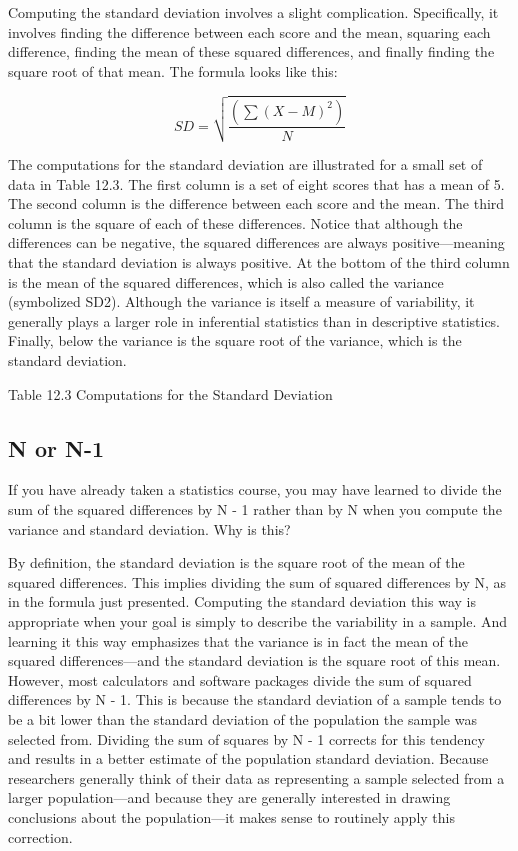 Computing the standard deviation involves a slight complication. Specifically, it involves finding the difference between each score and the mean, squaring each difference, finding the mean of these squared differences, and finally finding the square root of that mean. The formula looks like this:


\begin{equation}
SD=\sqrt{\frac{(\sum(X-M)^2)}{N}}
\end{equation}

The computations for the standard deviation are illustrated for a small set of data in Table 12.3. The first column is a set of eight scores that has a mean of 5. The second column is the difference between each score and the mean. The third column is the square of each of these differences. Notice that although the differences can be negative, the squared differences are always positive---meaning that the standard deviation is always positive. At the bottom of the third column is the mean of the squared differences, which is also called the variance (symbolized SD2). Although the variance is itself a measure of variability, it generally plays a larger role in inferential statistics than in descriptive statistics. Finally, below the variance is the square root of the variance, which is the standard deviation.

Table 12.3 Computations for the Standard Deviation

\subsection{N or N-1}

If you have already taken a statistics course, you may have learned to divide the sum of the squared differences by N - 1 rather than by N when you compute the variance and standard deviation. Why is this?

By definition, the standard deviation is the square root of the mean of the squared differences. This implies dividing the sum of squared differences by N, as in the formula just presented. Computing the standard deviation this way is appropriate when your goal is simply to describe the variability in a sample. And learning it this way emphasizes that the variance is in fact the mean of the squared differences---and the standard deviation is the square root of this mean.
However, most calculators and software packages divide the sum of squared differences by N - 1. This is because the standard deviation of a sample tends to be a bit lower than the standard deviation of the population the sample was selected from. Dividing the sum of squares by N - 1 corrects for this tendency and results in a better estimate of the population standard deviation. Because researchers generally think of their data as representing a sample selected from a larger population---and because they are generally interested in drawing conclusions about the population---it makes sense to routinely apply this correction.

